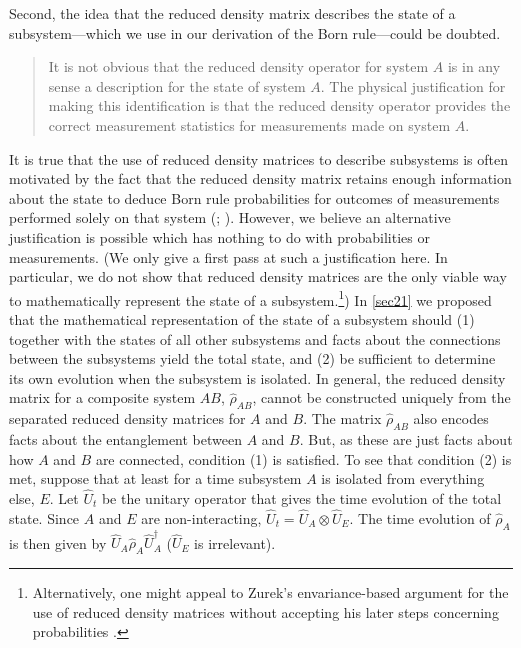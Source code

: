 \documentclass[onecolumn,secnumarabic,amsmath,amssymb,balancelastpage,nofootinbib]{article}
\begin{document}
Second, the idea that the reduced density matrix describes the state of a subsystem---which we use in our derivation of the Born rule---could be doubted.
\begin{quotation}
\noindent\small{{It is not obvious that the reduced density operator for system $A$ is in any sense a description for the state of system $A$. The physical justification for making this identification is that the reduced density operator provides the correct measurement statistics for measurements made on system $A$.  \citep[.3]{nielsen2010}}}
\end{quotation}
It is true that the use of reduced density matrices to describe subsystems is often motivated by the fact that the reduced density matrix retains enough information about the state to deduce Born rule probabilities for outcomes of measurements performed solely on that system (\citealp[.6]{schlosshauer}; \citealp[box 2.6]{nielsen2010}).  However, we believe an alternative justification is possible which has nothing to do with probabilities or measurements.  (We only give a first pass at such a justification here.  In particular, we do not show that reduced density matrices are the only viable  way to mathematically represent the state of a subsystem.\footnote{Alternatively, one might appeal to Zurek's envariance-based argument for the use of reduced density matrices without accepting his later steps concerning probabilities \citep[II.B]{zurek2005}.})  In \textsection \ref{sec21} we proposed that the mathematical representation of the state of a subsystem should (1) together with the states of all other subsystems and facts about the connections between the subsystems yield the total state, and (2) be sufficient to determine its own evolution when the subsystem is isolated.  In general, the reduced density matrix for a composite system $AB$, $\widehat{\rho}_{AB}$, cannot be constructed uniquely from the separated reduced density matrices for $A$ and $B$.  The matrix $\widehat{\rho}_{AB}$ also encodes facts about the entanglement between $A$ and $B$.  But, as these are just facts about how $A$ and $B$ are connected, condition (1) is satisfied.  To see that condition (2) is met, suppose that at least for a time subsystem $A$ is isolated from everything else, $E$.  Let $\widehat{U}_t$ be the unitary operator that gives the time evolution of the total state.  Since $A$ and $E$ are non-interacting, $\widehat{U}_t=\widehat{U}_A\otimes\widehat{U}_E$.  The time evolution of $\widehat{\rho}_A$ is then given by $\widehat{U}_A\widehat{\rho}_A\widehat{U}_A^\dagger$ ($\widehat{U}_E$ is irrelevant).
\end{document}
